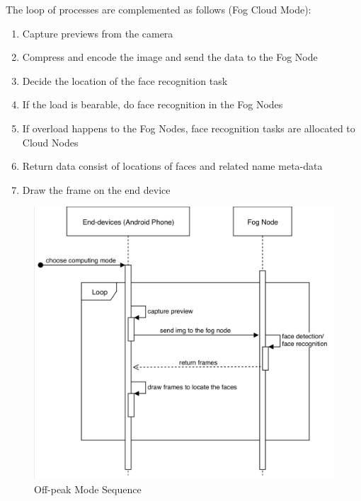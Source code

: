 The loop of processes are complemented as follows (Fog Cloud Mode):
\begin{enumerate}
    \item Capture previews from the camera
    \item Compress and encode the image and send the data to the Fog Node
    \item Decide the location of the face recognition task
    \item If the load is bearable, do face recognition in the Fog Nodes
    \item If overload happens to the Fog Nodes, face recognition tasks are allocated to Cloud Nodes
    \item Return data consist of locations of faces and related name meta-data
    \item Draw the frame on the end device
\end{enumerate}

\begin{figure}
    \centering
    \includegraphics[width=\textwidth]{images/fog_mode.png}
    \caption{Off-peak Mode Sequence}
    \label{fig:off-peak_mode_sequence}
\end{figure}

